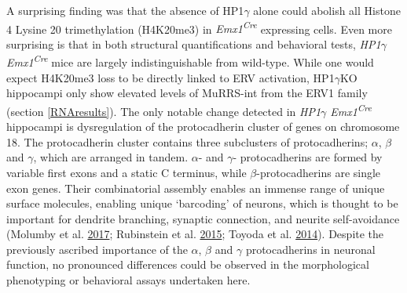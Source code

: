 \documentclass[onehalf,12pt]{beavtex}
\begin{document}
  A surprising finding was that the absence of HP1\(\gamma\) alone could
  abolish all Histone 4 Lysine 20 trimethylation (H4K20me3) in
  \emph{Emx1\textsuperscript{Cre}} expressing cells. Even more surprising
  is that in both structural quantifications and behavioral tests,
  \emph{HP1\(\gamma\) Emx1\textsuperscript{Cre}} mice are largely
  indistinguishable from wild-type. While one would expect H4K20me3 loss
  to be directly linked to ERV activation, HP1\(\gamma\)KO hippocampi only
  show elevated levels of MuRRS-int from the ERV1 family (section
  \ref{RNAresults}). The only notable change detected in
  \emph{HP1\(\gamma\) Emx1\textsuperscript{Cre}} hippocampi is
  dysregulation of the protocadherin cluster of genes on chromosome 18.
  The protocadherin cluster contains three subclusters of protocadherins;
  \(\alpha\), \(\beta\) and \(\gamma\), which are arranged in tandem.
  \(\alpha\)- and \(\gamma\)- protocadherins are formed by variable first
  exons and a static C terminus, while \(\beta\)-protocadherins are single
  exon genes. Their combinatorial assembly enables an immense range of
  unique surface molecules, enabling unique `barcoding' of neurons, which
  is thought to be important for dendrite branching, synaptic connection,
  and neurite self-avoidance (Molumby et al.
  \protect\hyperlink{ref-MolumbygProtocadherinsInteractNeuroligin12017}{2017};
  Rubinstein et al.
  \protect\hyperlink{ref-RubinsteinMolecularLogicNeuronal2015}{2015};
  Toyoda et al.
  \protect\hyperlink{ref-ToyodaDevelopmentalEpigeneticModification2014}{2014}).
  Despite the previously ascribed importance of the \(\alpha\), \(\beta\)
  and \(\gamma\) protocadherins in neuronal function, no pronounced
  differences could be observed in the morphological phenotyping or
  behavioral assays undertaken here.
  
\end{document}
